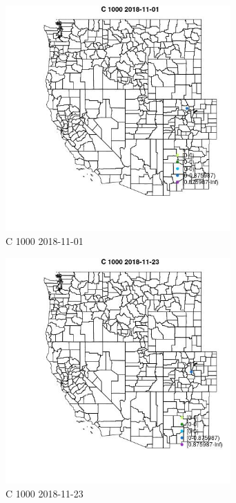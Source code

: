 \begin{figure} 
\centering  
\includegraphics[width=0.77\textwidth]{Code_Outputs/Report_ML_input_PM25_Step4_part_e_de_duplicated_aves_MapObsC_10002018-11-01.jpg} 
\caption{\label{fig:Report_ML_input_PM25_Step4_part_e_de_duplicated_avesMapObsC_10002018-11-01}C 1000 2018-11-01} 
\end{figure} 
 

\begin{figure} 
\centering  
\includegraphics[width=0.77\textwidth]{Code_Outputs/Report_ML_input_PM25_Step4_part_e_de_duplicated_aves_MapObsC_10002018-11-23.jpg} 
\caption{\label{fig:Report_ML_input_PM25_Step4_part_e_de_duplicated_avesMapObsC_10002018-11-23}C 1000 2018-11-23} 
\end{figure} 
 

